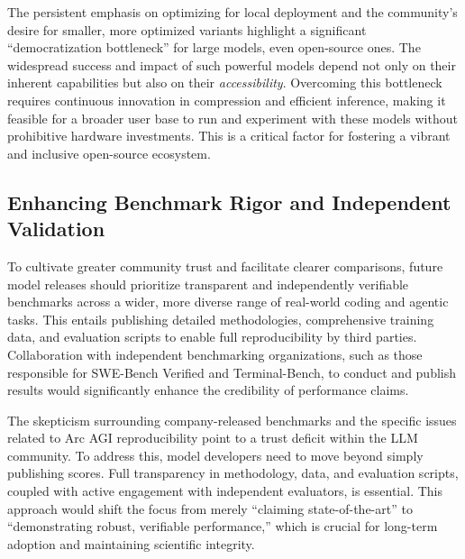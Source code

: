 The persistent emphasis on optimizing for local deployment and the community's desire for smaller, more optimized variants highlight a significant ``democratization bottleneck'' for large models, even open-source ones.\cite{hackernews_qwen3coder_2025, unsloth_qwen3coder_local_2025, reddit_localllama_kimi_qwen3coder_2025} The widespread success and impact of such powerful models depend not only on their inherent capabilities but also on their \textit{accessibility}. Overcoming this bottleneck requires continuous innovation in compression and efficient inference, making it feasible for a broader user base to run and experiment with these models without prohibitive hardware investments. This is a critical factor for fostering a vibrant and inclusive open-source ecosystem.

\subsection{Enhancing Benchmark Rigor and Independent Validation}

To cultivate greater community trust and facilitate clearer comparisons, future model releases should prioritize transparent and independently verifiable benchmarks across a wider, more diverse range of real-world coding and agentic tasks.\cite{youtube_qwen3coder_review_2025, reddit_localllama_qwen_benchmarks_2025} This entails publishing detailed methodologies, comprehensive training data, and evaluation scripts to enable full reproducibility by third parties.\cite{reddit_localllama_qwen_benchmarks_2025} Collaboration with independent benchmarking organizations, such as those responsible for SWE-Bench Verified and Terminal-Bench, to conduct and publish results would significantly enhance the credibility of performance claims.\cite{swebench_verified_2025, warp_swebench_2025, tbench_ai_2025, github_laude_terminalbench_2025, tbench_ai_docs_2025}

The skepticism surrounding company-released benchmarks and the specific issues related to Arc AGI reproducibility point to a trust deficit within the LLM community.\cite{youtube_qwen3coder_review_2025, reddit_localllama_qwen_benchmarks_2025} To address this, model developers need to move beyond simply publishing scores. Full transparency in methodology, data, and evaluation scripts, coupled with active engagement with independent evaluators, is essential. This approach would shift the focus from merely ``claiming state-of-the-art'' to ``demonstrating robust, verifiable performance,'' which is crucial for long-term adoption and maintaining scientific integrity.

